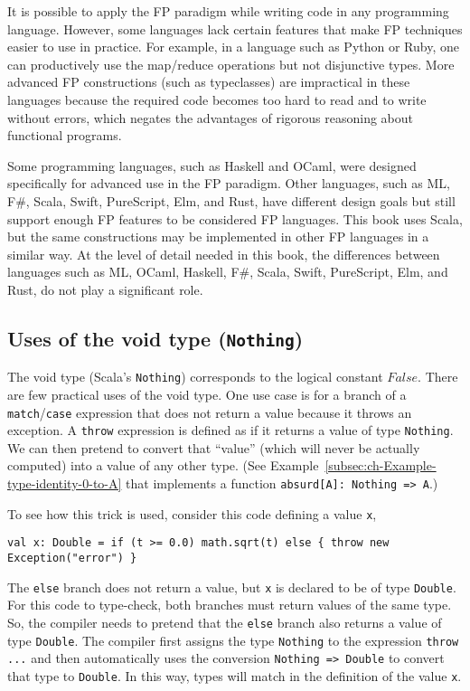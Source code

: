 It is possible to apply the FP paradigm while writing code in any
programming language. However, some languages lack certain features
that make FP techniques easier to use in practice. For example, in
a language such as Python or Ruby, one can productively use the map/reduce
operations but not disjunctive types. More advanced FP constructions
(such as typeclasses) are impractical in these languages because the
required code becomes too hard to read and to write without errors,
which negates the advantages of rigorous reasoning about functional
programs.

Some programming languages, such as Haskell and OCaml, were designed
specifically for advanced use in the FP paradigm. Other languages,
such as ML, F\#, Scala, Swift, PureScript, Elm, and Rust, have different
design goals but still support enough FP features to be considered
FP languages. This book uses Scala, but the same constructions may
be implemented in other FP languages in a similar way. At the level
of detail needed in this book, the differences between languages such
as ML, OCaml, Haskell, F\#, Scala, Swift, PureScript, Elm, and Rust,
do not play a significant role.

\subsection{Uses of the void type (\texttt{Nothing})}

The void type (Scala\textsf{'}s \lstinline!Nothing!) corresponds
to the logical constant $False$. There are few practical uses of
the void type. One use case is for a branch of a \lstinline!match!/\lstinline!case!
expression that does not return a value because it throws an exception.
A \lstinline!throw! expression is defined as if it returns a value
of type \lstinline!Nothing!. We can then pretend to convert that
\textsf{``}value\textsf{''} (which will never be actually computed) into a value of
any other type. (See Example~\ref{subsec:ch-Example-type-identity-0-to-A}
that implements a function \lstinline!absurd[A]: Nothing => A!.) 

To see how this trick is used, consider this code defining a value
\lstinline!x!,
\begin{lstlisting}
val x: Double = if (t >= 0.0) math.sqrt(t) else { throw new Exception("error") }
\end{lstlisting}
The \lstinline!else! branch does not return a value, but \lstinline!x!
is declared to be of type \lstinline!Double!. For this code to type-check,
both branches must return values of the same type. So, the compiler
needs to pretend that the \lstinline!else! branch also returns a
value of type \lstinline!Double!. The compiler first assigns the
type \lstinline!Nothing! to the expression \lstinline!throw ...!
and then automatically uses the conversion \lstinline!Nothing => Double!
to convert that type to \lstinline!Double!. In this way, types will
match in the definition of the value \lstinline!x!. 

